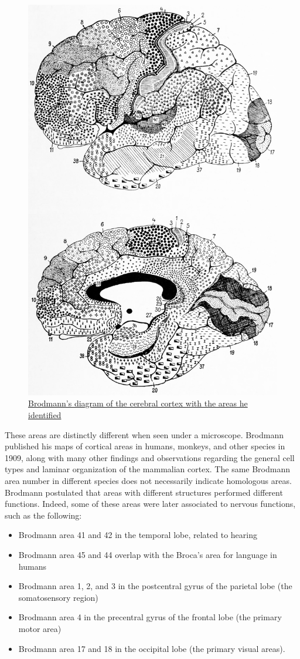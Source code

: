 \begin{figure}

{\centering \includegraphics[width=0.7\linewidth]{./figures/cns/Brodmann_original} 

}

\caption{\href{https://wellcomelibrary.org/item/b28062449}{Brodmann's diagram of the cerebral cortex with the areas he identified}}\label{fig:brodmannareas}
\end{figure}

These areas are distinctly different when seen under a microscope. Brodmann published his maps of cortical areas in humans, monkeys, and other species in 1909, along with many other findings and observations regarding the general cell types and laminar organization of the mammalian cortex. The same Brodmann area number in different species does not necessarily indicate homologous areas. Brodmann postulated that areas with different structures performed different functions. Indeed, some of these areas were later associated to nervous functions, such as the following:

\begin{itemize}
\tightlist
\item
  Brodmann area 41 and 42 in the temporal lobe, related to hearing
\item
  Brodmann area 45 and 44 overlap with the Broca's area for language in humans
\item
  Brodmann area 1, 2, and 3 in the postcentral gyrus of the parietal lobe (the somatosensory region)
\item
  Brodmann area 4 in the precentral gyrus of the frontal lobe (the primary motor area)
\item
  Brodmann area 17 and 18 in the occipital lobe (the primary visual areas).
\end{itemize}

